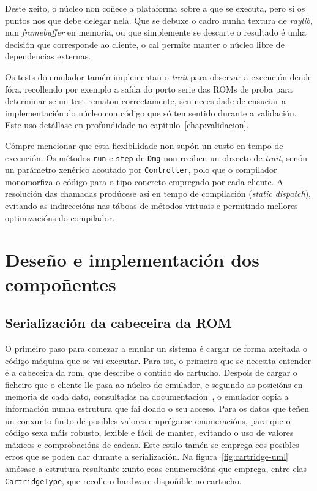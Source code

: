 Deste xeito, o núcleo non coñece a plataforma sobre a que se executa, pero si os puntos nos que debe delegar nela.
Que se debuxe o cadro nunha textura de \textit{raylib}, nun \textit{framebuffer} en memoria, ou que simplemente se descarte o resultado
é unha decisión que corresponde ao cliente, o cal permite manter o núcleo libre de dependencias externas.

Os tests do emulador tamén implementan o \textit{trait} para observar a execución dende fóra,
recollendo por exemplo a saída do porto serie das ROMs de proba para determinar se un test rematou correctamente,
sen necesidade de ensuciar a implementación do núcleo con código que só ten sentido durante a validación.
Este uso detállase en profundidade no capítulo~\ref{chap:validacion}.

Cómpre mencionar que esta flexibilidade non supón un custo en tempo de execución.
Os métodos \texttt{run} e \texttt{step} de \texttt{Dmg} non reciben un obxecto de \textit{trait}, senón un parámetro xenérico acoutado por \texttt{Controller},
polo que o compilador monomorfiza o código para o tipo concreto empregado por cada cliente.
A resolución das chamadas prodúcese así en tempo de compilación (\textit{static dispatch}),
evitando as indireccións nas táboas de métodos virtuais e permitindo mellores optimizacións do compilador.

\section{Deseño e implementación dos compoñentes}
\subsection{Serialización da cabeceira da ROM}
O primeiro paso para comezar a emular un sistema é cargar de forma axeitada o código máquina que se vai executar.
Para iso, o primeiro que se necesita entender é a cabeceira da \acrshort{rom}, que describe o contido do cartucho.
Despois de cargar o ficheiro que o cliente lle pasa ao núcleo do emulador, e seguindo as posicións en memoria de cada dato,
consultadas na documentación~\cite{pandocs},
o emulador copia a información nunha estrutura que fai doado o seu acceso.
Para os datos que teñen un conxunto finito de posibles valores empréganse enumeracións, para que o código sexa máis robusto, lexible e fácil de manter,
evitando o uso de valores máxicos e comprobacións de cadeas. Este estilo tamén se emprega cos posibles erros que se poden dar durante a serialización.
Na figura~\ref{fig:cartridge-uml} amósase a estrutura resultante xunto coas enumeracións que emprega, entre elas
\texttt{CartridgeType}, que recolle o hardware dispoñible no cartucho.

